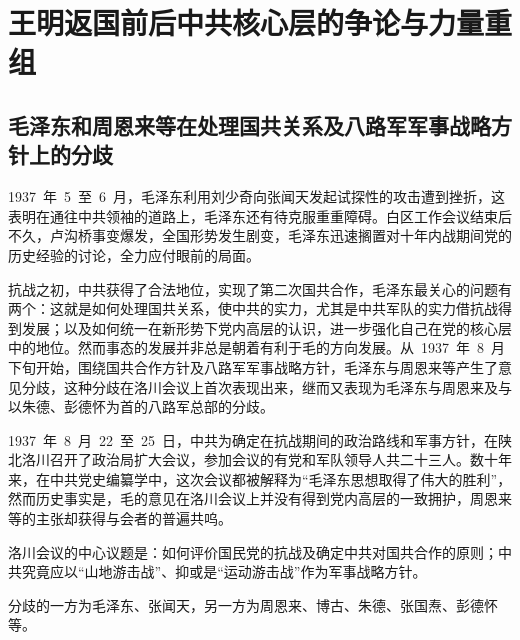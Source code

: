 
\chapter{王明返国前后中共核心层的争论与力量重组}

\section{毛泽东和周恩来等在处理国共关系及八路军军事战略方针上的分歧}

1937~年~5~至~6~月，毛泽东利用刘少奇向张闻天发起试探性的攻击遭到挫折，这表明在通往中共领袖的道路上，毛泽东还有待克服重重障碍。白区工作会议结束后不久，卢沟桥事变爆发，全国形势发生剧变，毛泽东迅速搁置对十年内战期间党的历史经验的讨论，全力应付眼前的局面。

抗战之初，中共获得了合法地位，实现了第二次国共合作，毛泽东最关心的问题有两个：这就是如何处理国共关系，使中共的实力，尤其是中共军队的实力借抗战得到发展；以及如何统一在新形势下党内高层的认识，进一步强化自己在党的核心层中的地位。然而事态的发展并非总是朝着有利于毛的方向发展。从~1937~年~8~月下旬开始，围绕国共合作方针及八路军军事战略方针，毛泽东与周恩来等产生了意见分歧，这种分歧在洛川会议上首次表现出来，继而又表现为毛泽东与周恩来及与以朱德、彭德怀为首的八路军总部的分歧。

1937~年~8~月~22~至~25~日，中共为确定在抗战期间的政治路线和军事方针，在陕北洛川召开了政治局扩大会议，参加会议的有党和军队领导人共二十三人。数十年来，在中共党史编纂学中，这次会议都被解释为“毛泽东思想取得了伟大的胜利”，然而历史事实是，毛的意见在洛川会议上并没有得到党内高层的一致拥护，周恩来等的主张却获得与会者的普遍共呜。

洛川会议的中心议题是：如何评价国民党的抗战及确定中共对国共合作的原则；中共究竟应以“山地游击战”、抑或是“运动游击战”作为军事战略方针。

分歧的一方为毛泽东、张闻天，另一方为周恩来、博古、朱德、张国焘、彭德怀等。

